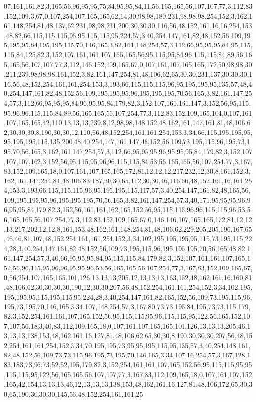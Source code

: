 07,161,161,82,3,165,56,96,95,95,75,84,95,95,84,11,56,165,165,56,107,107,77,3,112,83,152,109,3,67,0,107,254,107,165,165,62,14,30,98,98,180,231,98,98,98,254,152,3,162,161,148,254,81,48,137,62,231,98,98,231,200,30,30,30,116,56,48,152,161,16,16,254,153,48,82,66,115,115,115,96,95,115,115,95,224,57,3,40,254,147,161,82,48,152,56,109,195,195,95,84,195,195,115,70,146,165,3,82,161,148,254,57,3,112,66,95,95,95,84,95,115,115,84,125,82,3,152,107,161,161,107,165,165,56,95,115,95,84,96,115,115,84,89,56,165,165,56,107,107,77,3,112,146,152,109,165,67,0,107,161,107,165,165,172,50,98,98,30,211,239,98,98,98,161,152,3,82,161,147,254,81,48,106,62,65,30,30,231,137,30,30,30,116,56,48,152,254,161,161,254,153,3,193,66,115,115,115,96,95,195,195,95,135,57,48,40,254,147,161,82,48,152,56,109,195,195,95,96,195,195,195,70,56,165,3,82,161,147,254,57,3,112,66,95,95,95,84,96,95,95,84,179,82,3,152,107,161,161,147,3,152,56,95,115,95,96,96,115,115,84,89,56,165,165,56,107,254,77,3,112,83,152,109,165,104,0,107,161,107,165,165,42,110,13,13,13,239,8,12,98,98,148,152,48,162,161,147,161,81,48,106,62,30,30,30,8,190,30,30,12,110,56,48,152,254,161,161,254,153,3,34,66,115,195,195,95,95,195,195,115,135,200,48,40,254,147,161,147,48,152,56,109,73,195,115,96,195,73,195,70,56,165,3,162,161,147,254,57,3,112,66,95,95,95,96,95,95,95,84,179,82,3,152,107,107,107,162,3,152,56,95,115,95,96,96,115,115,84,53,56,165,165,56,107,254,77,3,167,83,152,109,165,18,0,107,161,107,165,165,172,81,12,12,12,217,232,12,30,8,161,152,3,162,161,147,254,81,48,106,83,187,30,30,65,112,30,30,46,116,56,48,152,161,16,161,254,153,3,193,66,115,115,115,96,95,195,195,115,117,57,3,40,254,147,161,82,48,165,56,109,195,195,95,96,195,195,195,70,56,165,3,82,161,147,254,57,3,40,171,95,95,95,96,96,95,95,84,179,82,3,152,56,161,161,162,165,152,56,95,115,115,96,96,115,115,96,53,56,165,165,56,107,254,77,3,112,83,152,109,165,67,0,146,146,107,165,165,172,81,12,12,13,217,202,12,12,8,161,153,48,162,161,148,254,81,48,106,62,229,205,205,196,167,65,46,46,81,107,48,152,254,161,161,254,152,3,34,102,195,195,195,95,115,73,195,115,224,28,3,40,254,147,161,82,48,152,56,109,73,195,115,96,195,195,195,70,56,165,48,82,161,147,254,57,3,40,66,95,95,95,84,95,115,115,84,179,82,3,152,107,161,161,107,165,152,56,96,115,95,96,96,95,95,96,53,56,165,165,56,107,254,77,3,167,83,152,109,165,67,0,56,254,107,165,165,101,126,13,13,13,205,12,13,13,13,163,152,48,162,161,16,160,81,48,106,62,30,30,30,30,190,12,30,30,207,56,48,152,254,161,161,254,152,3,34,102,195,195,195,95,115,195,115,95,224,28,3,40,254,147,161,82,165,152,56,109,73,195,115,96,195,73,195,70,146,165,3,34,107,148,254,57,3,167,80,73,73,195,84,195,73,73,115,179,82,3,152,254,161,161,107,165,152,56,95,115,115,95,96,115,115,95,122,56,165,152,107,107,56,18,3,40,83,112,109,165,18,0,107,161,107,165,165,101,126,13,13,13,205,46,13,13,13,138,153,48,162,161,16,127,81,48,106,62,65,30,30,8,190,30,30,30,207,56,48,152,254,161,161,254,152,3,34,70,195,195,73,95,95,195,115,95,135,57,3,40,254,148,161,82,48,152,56,109,73,73,115,96,195,73,195,70,146,165,3,34,107,16,254,57,3,167,128,183,183,73,96,73,52,52,195,179,82,3,152,254,161,161,107,165,152,56,95,115,115,95,95,115,115,95,122,56,165,165,56,107,107,77,3,167,83,112,109,165,18,0,107,161,107,152,165,42,154,13,13,13,46,12,13,13,13,138,153,48,162,161,16,127,81,48,106,172,65,30,30,65,190,30,30,30,145,56,48,152,254,161,161,25